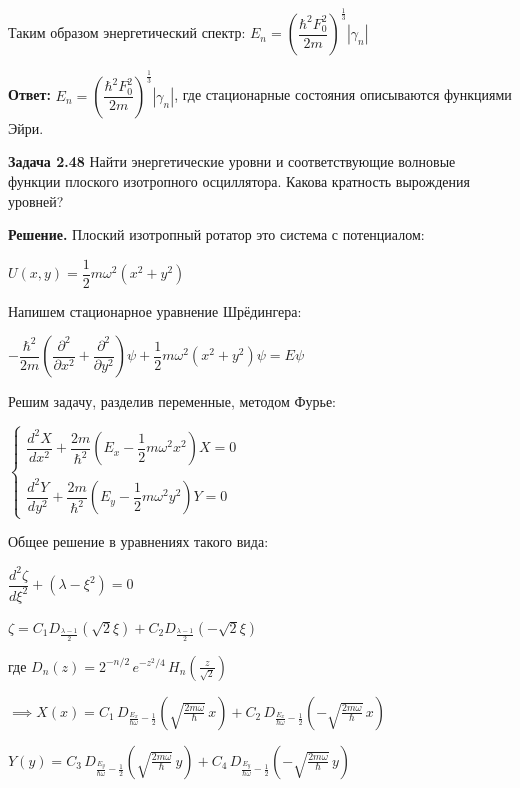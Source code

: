 \documentclass[a4paper, 12pt]{article}
\begin{document}
	\quad Таким образом энергетический спектр:  $E_n = \left(\dfrac{\hbar^2 F_0^2}{2m}\right)^{\frac{1}{3}} |\gamma_n|$
	
	\quad \textbf{Ответ: } $E_n = \left(\dfrac{\hbar^2 F_0^2}{2m}\right)^{\frac{1}{3}} |\gamma_n|$, где стационарные состояния описываются функциями Эйри.
	
	\quad \textbf{Задача 2.48} Найти энергетические уровни и соответствующие волновые функции плоского изотропного осциллятора. Какова кратность вырождения уровней?
	
	\quad \textbf{Решение.} Плоский изотропный ротатор это система с потенциалом: 
	
	\begin{center}
		$U(x, y) = \dfrac{1}{2}m\omega^2 \left(x^2 + y^2\right) $
	\end{center}
	
	\quad Напишем стационарное уравнение Шрёдингера: 
	
	\begin{center}
		$-\dfrac{\hbar^2}{2m} \left(\dfrac{\partial^2}{\partial x^2} + \dfrac{\partial^2}{\partial y^2}\right)\psi + \dfrac{1}{2} m\omega^2 (x^2 + y^2) \psi = E\psi $
	\end{center}

	\quad Решим задачу, разделив переменные, методом Фурье: 
	
	\begin{center}
		$\begin{cases}
			\dfrac{d^2 X}{dx^2} + \dfrac{2m}{\hbar^2} \left( E_x - \dfrac{1}{2} m \omega^2 x^2 \right) X = 0 \\
			\\
			\dfrac{d^2 Y}{dy^2} + \dfrac{2m}{\hbar^2} \left( E_y - \dfrac{1}{2} m \omega^2 y^2 \right) Y = 0
		\end{cases}$
		
	\end{center}
	
	\quad Общее решение в уравнениях такого вида:
	
	\begin{center}
		$\dfrac{d^2 \zeta}{d\xi^2} + \left(\lambda - \xi^2 \right) = 0$
		
		$\zeta = C_1 D_{\frac{\lambda - 1}{2}} (\sqrt{2}\xi ) + C_2 D_{\frac{\lambda - 1}{2}} (-\sqrt{2}\xi )$
		
		где $D_n(z) = 2^{-n/2} \, e^{-z^2/4} \, H_n\!\left( \frac{z}{\sqrt{2}} \right)$
		
		$\implies X(x) = C_1 \, D_{\frac{E_x}{\hbar\omega} - \frac{1}{2}}\!\left( \sqrt{\frac{2m\omega}{\hbar}}\, x \right) 
		+ C_2 \, D_{\frac{E_x}{\hbar\omega} - \frac{1}{2}}\!\left( -\sqrt{\frac{2m\omega}{\hbar}}\, x \right)$
		
		$Y(y) = C_3 \, D_{\frac{E_y}{\hbar\omega} - \frac{1}{2}}\!\left( \sqrt{\frac{2m\omega}{\hbar}}\, y \right) 
		+ C_4 \, D_{\frac{E_y}{\hbar\omega} - \frac{1}{2}}\!\left( -\sqrt{\frac{2m\omega}{\hbar}}\, y \right)$
	\end{center}
	
\end{document}
